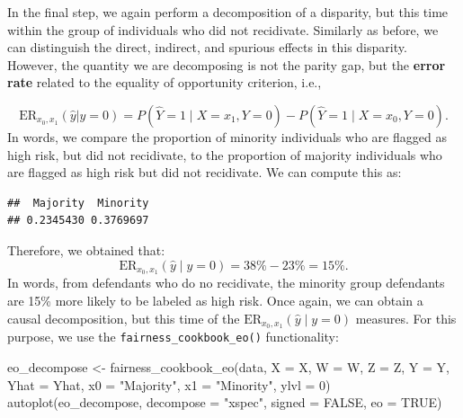 \documentclass{article}
\newenvironment{Shaded}{\begin{snugshade}}{\end{snugshade}}
\newcommand{\AttributeTok}[1]{\textcolor[rgb]{0.77,0.63,0.00}{#1}}
\newcommand{\ConstantTok}[1]{\textcolor[rgb]{0.00,0.00,0.00}{#1}}
\newcommand{\DecValTok}[1]{\textcolor[rgb]{0.00,0.00,0.81}{#1}}
\newcommand{\FunctionTok}[1]{\textcolor[rgb]{0.00,0.00,0.00}{#1}}
\newcommand{\NormalTok}[1]{#1}
\newcommand{\OtherTok}[1]{\textcolor[rgb]{0.56,0.35,0.01}{#1}}
\newcommand{\SpecialCharTok}[1]{\textcolor[rgb]{0.00,0.00,0.00}{#1}}
\newcommand{\StringTok}[1]{\textcolor[rgb]{0.31,0.60,0.02}{#1}}
\begin{document}
In the final step, we again perform a decomposition of a disparity, but
this time within the group of individuals who did not recidivate.
Similarly as before, we can distinguish the direct, indirect, and
spurious effects in this disparity. However, the quantity we are
decomposing is not the parity gap, but the \textbf{error rate} related
to the equality of opportunity criterion, i.e.,

\begin{equation}
\text{ER}_{x_0, x_1}(\hat{y} | y = 0) = P(\hat{Y} = 1 \mid X = x_1, Y = 0) - P(\hat{Y} = 1 \mid X = x_0, Y = 0).
\end{equation} In words, we compare the proportion of minority
individuals who are flagged as high risk, but did not recidivate, to the
proportion of majority individuals who are flagged as high risk but did
not recidivate. We can compute this as:

\begin{Shaded}
\end{Shaded}

\begin{verbatim}
##  Majority  Minority 
## 0.2345430 0.3769697
\end{verbatim}

Therefore, we obtained that: \begin{equation}
\text{ER}_{x_0, x_1}(\hat{y} \mid y = 0) = 38\% - 23\% = 15\%.
\end{equation} In words, from defendants who do no recidivate, the
minority group defendants are 15\% more likely to be labeled as high
risk. Once again, we can obtain a causal decomposition, but this time of
the \(\text{ER}_{x_0, x_1}(\hat{y} \mid y = 0)\) measures. For this
purpose, we use the \texttt{fairness\_cookbook\_eo()} functionality:

\begin{Shaded}
\begin{Highlighting}[]
\NormalTok{eo\_decompose }\OtherTok{\textless{}{-}} \FunctionTok{fairness\_cookbook\_eo}\NormalTok{(data, }\AttributeTok{X =}\NormalTok{ X, }\AttributeTok{W =}\NormalTok{ W, }\AttributeTok{Z =}\NormalTok{ Z, }\AttributeTok{Y =}\NormalTok{ Y,}
                            \AttributeTok{Yhat =}\NormalTok{ Yhat, }\AttributeTok{x0 =} \StringTok{"Majority"}\NormalTok{, }\AttributeTok{x1 =} \StringTok{"Minority"}\NormalTok{,}
                            \AttributeTok{ylvl =} \DecValTok{0}\NormalTok{)}
\FunctionTok{autoplot}\NormalTok{(eo\_decompose, }\AttributeTok{decompose =} \StringTok{"xspec"}\NormalTok{, }\AttributeTok{signed =} \ConstantTok{FALSE}\NormalTok{, }\AttributeTok{eo =} \ConstantTok{TRUE}\NormalTok{)}
\end{Highlighting}
\end{Shaded}
\end{document}
